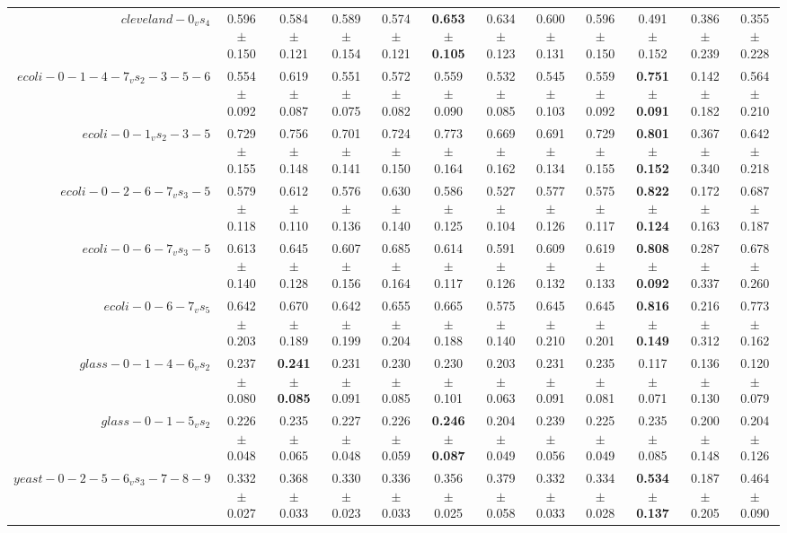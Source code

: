 \begin{table}[!ht]
{\begin{tabular}{r c c c c c c c c c c c}
$cleveland-0_vs_4$ & 0.596 $\pm$ 0.150 & 0.584 $\pm$ 0.121 & 0.589 $\pm$ 0.154 & 0.574 $\pm$ 0.121 & \textbf{0.653 $\pm$ 0.105} & 0.634 $\pm$ 0.123 & 0.600 $\pm$ 0.131 & 0.596 $\pm$ 0.150 & 0.491 $\pm$ 0.152 & 0.386 $\pm$ 0.239 & 0.355 $\pm$ 0.228 \\
$ecoli-0-1-4-7_vs_2-3-5-6$ & 0.554 $\pm$ 0.092 & 0.619 $\pm$ 0.087 & 0.551 $\pm$ 0.075 & 0.572 $\pm$ 0.082 & 0.559 $\pm$ 0.090 & 0.532 $\pm$ 0.085 & 0.545 $\pm$ 0.103 & 0.559 $\pm$ 0.092 & \textbf{0.751 $\pm$ 0.091} & 0.142 $\pm$ 0.182 & 0.564 $\pm$ 0.210 \\
$ecoli-0-1_vs_2-3-5$ & 0.729 $\pm$ 0.155 & 0.756 $\pm$ 0.148 & 0.701 $\pm$ 0.141 & 0.724 $\pm$ 0.150 & 0.773 $\pm$ 0.164 & 0.669 $\pm$ 0.162 & 0.691 $\pm$ 0.134 & 0.729 $\pm$ 0.155 & \textbf{0.801 $\pm$ 0.152} & 0.367 $\pm$ 0.340 & 0.642 $\pm$ 0.218 \\
$ecoli-0-2-6-7_vs_3-5$ & 0.579 $\pm$ 0.118 & 0.612 $\pm$ 0.110 & 0.576 $\pm$ 0.136 & 0.630 $\pm$ 0.140 & 0.586 $\pm$ 0.125 & 0.527 $\pm$ 0.104 & 0.577 $\pm$ 0.126 & 0.575 $\pm$ 0.117 & \textbf{0.822 $\pm$ 0.124} & 0.172 $\pm$ 0.163 & 0.687 $\pm$ 0.187 \\
$ecoli-0-6-7_vs_3-5$ & 0.613 $\pm$ 0.140 & 0.645 $\pm$ 0.128 & 0.607 $\pm$ 0.156 & 0.685 $\pm$ 0.164 & 0.614 $\pm$ 0.117 & 0.591 $\pm$ 0.126 & 0.609 $\pm$ 0.132 & 0.619 $\pm$ 0.133 & \textbf{0.808 $\pm$ 0.092} & 0.287 $\pm$ 0.337 & 0.678 $\pm$ 0.260 \\
$ecoli-0-6-7_vs_5$ & 0.642 $\pm$ 0.203 & 0.670 $\pm$ 0.189 & 0.642 $\pm$ 0.199 & 0.655 $\pm$ 0.204 & 0.665 $\pm$ 0.188 & 0.575 $\pm$ 0.140 & 0.645 $\pm$ 0.210 & 0.645 $\pm$ 0.201 & \textbf{0.816 $\pm$ 0.149} & 0.216 $\pm$ 0.312 & 0.773 $\pm$ 0.162 \\
$glass-0-1-4-6_vs_2$ & 0.237 $\pm$ 0.080 & \textbf{0.241 $\pm$ 0.085} & 0.231 $\pm$ 0.091 & 0.230 $\pm$ 0.085 & 0.230 $\pm$ 0.101 & 0.203 $\pm$ 0.063 & 0.231 $\pm$ 0.091 & 0.235 $\pm$ 0.081 & 0.117 $\pm$ 0.071 & 0.136 $\pm$ 0.130 & 0.120 $\pm$ 0.079 \\
$glass-0-1-5_vs_2$ & 0.226 $\pm$ 0.048 & 0.235 $\pm$ 0.065 & 0.227 $\pm$ 0.048 & 0.226 $\pm$ 0.059 & \textbf{0.246 $\pm$ 0.087} & 0.204 $\pm$ 0.049 & 0.239 $\pm$ 0.056 & 0.225 $\pm$ 0.049 & 0.235 $\pm$ 0.085 & 0.200 $\pm$ 0.148 & 0.204 $\pm$ 0.126 \\
$yeast-0-2-5-6_vs_3-7-8-9$ & 0.332 $\pm$ 0.027 & 0.368 $\pm$ 0.033 & 0.330 $\pm$ 0.023 & 0.336 $\pm$ 0.033 & 0.356 $\pm$ 0.025 & 0.379 $\pm$ 0.058 & 0.332 $\pm$ 0.033 & 0.334 $\pm$ 0.028 & \textbf{0.534 $\pm$ 0.137} & 0.187 $\pm$ 0.205 & 0.464 $\pm$ 0.090 \\

\end{tabular}}
\end{table}
